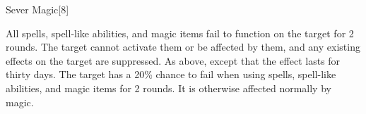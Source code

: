 \begin{spellsection}{Sever Magic}[8]
    \begin{spellheader}
    \end{spellheader}
    \begin{spellcontent}
        \begin{spelltargetinginfo}
        \end{spelltargetinginfo}
        \begin{spelleffects}
            \begin{spellattack}
                \spellsuccess All spells, spell-like abilities, and magic items fail to function on the target for 2 rounds. The target cannot activate them or be affected by them, and any existing effects on the target are suppressed.
                \spellcritical As above, except that the effect lasts for thirty days.
                \spellfailure The target has a 20\% chance to fail when using spells, spell-like abilities, and magic items for 2 rounds. It is otherwise affected normally by magic.
            \end{spellattack}
        \end{spelleffects}
    \end{spellcontent}
    \begin{spellfooter}
        \miscastexplode
    \end{spellfooter}
\end{spellsection}

